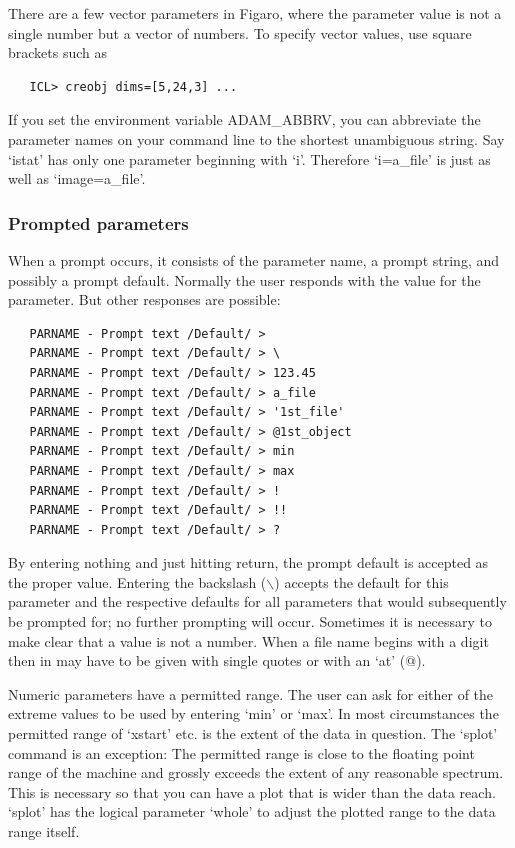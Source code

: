    There are a few vector parameters in Figaro, where the parameter
   value is not a single number but a vector of numbers. To specify
   vector values, use square brackets such as

\begin{verbatim}
   ICL> creobj dims=[5,24,3] ...
\end{verbatim}

   If you set the environment variable ADAM\_ABBRV, you can abbreviate
   the parameter names on your command line to the shortest unambiguous
   string. Say `istat' has only one parameter beginning with `i'. Therefore
   `i=a\_file' is just as well as `image=a\_file'.


\subsubsection{\label{paramsprompt}Prompted parameters}

   When a prompt occurs, it consists of the parameter name, a prompt
   string, and possibly a prompt default. Normally the user responds
   with the value for the parameter. But other responses are possible:

\begin{verbatim}
   PARNAME - Prompt text /Default/ >
   PARNAME - Prompt text /Default/ > \
   PARNAME - Prompt text /Default/ > 123.45
   PARNAME - Prompt text /Default/ > a_file
   PARNAME - Prompt text /Default/ > '1st_file'
   PARNAME - Prompt text /Default/ > @1st_object
   PARNAME - Prompt text /Default/ > min
   PARNAME - Prompt text /Default/ > max
   PARNAME - Prompt text /Default/ > !
   PARNAME - Prompt text /Default/ > !!
   PARNAME - Prompt text /Default/ > ?
\end{verbatim}

   By entering nothing and just hitting return, the prompt default is
   accepted as the proper value. Entering the backslash ($\backslash$)
   accepts the default for this parameter and the respective defaults
   for all parameters that would subsequently be prompted for; no
   further prompting will occur. Sometimes it is necessary to make clear
   that a value is not a number. When a file name begins with a digit
   then in may have to be given with single quotes or with an `at' (@).

   Numeric parameters have a permitted range. The user can ask for
   either of the extreme values to be used by entering `min' or
   `max'. In most circumstances the permitted range of `xstart' etc. is
   the extent of the data in question. The `splot' command is an
   exception: The permitted range is close to the floating point range
   of the machine and grossly exceeds the extent of any reasonable
   spectrum. This is necessary so that you can have a plot that is wider
   than the data reach. `splot' has the logical parameter `whole' to
   adjust the plotted range to the data range itself.

